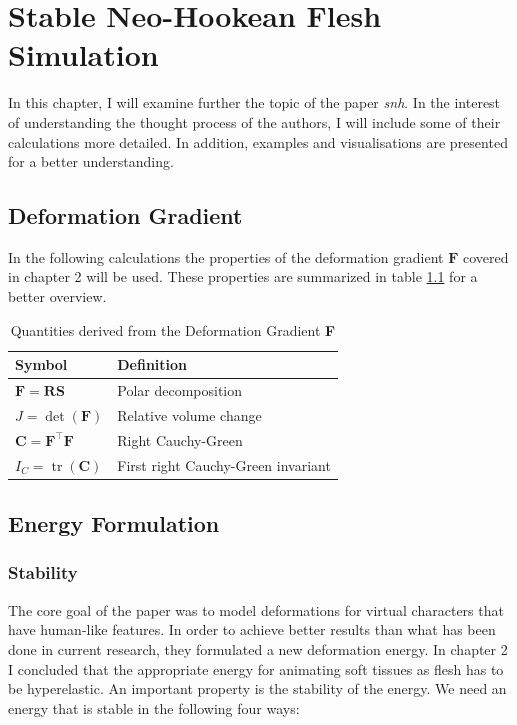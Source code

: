 \chapter{Stable Neo-Hookean Flesh Simulation} \label{c:Paper}
In this chapter, I will examine further the topic of the paper \textit{\acrshort{snh}}. In the interest of understanding the thought process of the authors, I will include some of their calculations more detailed. In addition, examples and visualisations are presented for a better understanding. 

\section{Deformation Gradient}
In the following calculations the properties of the deformation gradient $\mathbf{F}$ covered in chapter 2 will be used. These properties are summarized in table \ref{table:gradient_quantities} for a better overview.

\begin{table}[!htbp]
\centering
    \begin{tabular}{ | l | l |}
    \hline
    \textbf{Symbol} & \textbf{Definition} \\ \hline
    $\mathbf{F} = \mathbf{RS}$ & Polar decomposition \\ \hline
    $J=\operatorname{det}(\mathbf{F})$ & Relative volume change \\ \hline
    $\mathbf{C}=\mathbf{F}^\intercal \mathbf{F}$ & Right Cauchy-Green  \\ \hline	
    $I_{C}=\operatorname{tr}(\mathbf{C})$ & First right Cauchy-Green invariant \\ \hline
    \end{tabular}
    \caption[Quantities derived from the Deformation Gradient]{Quantities derived from the Deformation Gradient \textbf{F}}
\label{table:gradient_quantities}
\end{table}


\section{Energy Formulation}
\subsection{Stability}
The core goal of the paper was to model deformations for virtual characters that have human-like features. In order to achieve better results than what has been done in current research, they formulated a new deformation energy. In chapter 2 I concluded that the appropriate energy for animating soft tissues as flesh has to be hyperelastic. An important property is the stability of the energy. We need an energy that is stable in the following four ways:

